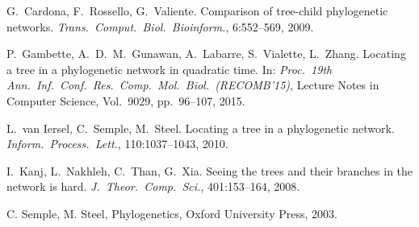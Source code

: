 \documentclass[11pt]{amsart}
\begin{document}
\begin{thebibliography}{99}

G.\ Cardona, F.\ Rossello, G.\ Valiente. Comparison of tree-child phylogenetic networks. {\em Trans.\ Comput.\ Biol.\ Bioinform.}, 6:552--569, 2009.

P.\ Gambette, A.\ D.\ M.\ Gunawan, A.\ Labarre, S.\ Vialette, L.\ Zhang. Locating a tree in a phylogenetic network in quadratic time. In: {\em Proc.\ 19th Ann.\ Inf.\ Conf.\ Res.\ Comp.\ Mol.\ Biol.\ (RECOMB'15)}, Lecture Notes in Computer Science, Vol.\ 9029, pp.\ 96--107, 2015.

L.\ van Iersel, C.\ Semple, M.\ Steel. Locating a tree in a phylogenetic network. {\em Inform.\ Process.\ Lett.}, 110:1037--1043, 2010.

I.\ Kanj, L.\ Nakhleh, C.\ Than, G.\ Xia. Seeing the trees and their branches in the network is hard. {\em J.\ Theor.\ Comp.\ Sci.}, 401:153--164, 2008.

 C. Semple, M. Steel, Phylogenetics, Oxford University Press, 2003.

\end{thebibliography}
\end{document}
